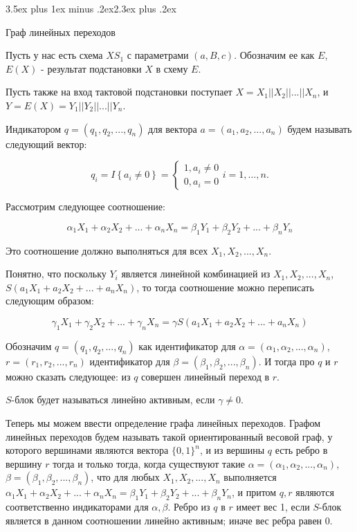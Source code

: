 \documentclass[a4paper,12pt]{report}
\makeatletter
\theoremstyle{plain} %
\theoremstyle{definition}
\theoremstyle{remark}
\renewcommand{\section}{\@startsection{section}{1}{18pt}%
{3.5ex plus 1ex minus .2ex}{2.3ex plus .2ex}%
{\normalfont\Large\bfseries\raggedright}}%
\makeatother
\begin{document}
\begin{large}
\section{Граф линейных переходов}

Пусть у нас есть схема $XS_1$ с параметрами $(a, B, c)$. Обозначим ее как $E$,  $E(X)$ - результат подстановки $X$ в схему $E$. 

Пусть также на вход тактовой подстановки поступает $X = X_1||X_2||...||X_n$, и $Y=E(X) = Y_1||Y_2||...||Y_n$.

Индикатором $q = (q_1, q_2, ..., q_n)$ для вектора $a=(a_1, a_2, ..., a_n)$ будем называть следующий вектор:

\begin{equation}
q_i=I\left\{a_i\ne 0\right\}=\left\{ \begin{array}{c}
1,a_i \neq 0 \\
0,a_i = 0\end{array}
\right.i=1,\dots , n.
\end{equation}

Рассмотрим следующее соотношение:

\begin{equation}
\label{eq:lin_proportion}
\alpha_1X_1 + \alpha_2X_2 + ... + \alpha_nX_n = \beta_1Y_1 + \beta_2Y_2 + ... + \beta_nY_n
\end{equation}

Это соотношение должно выполняться для всех $X_1, X_2, ..., X_n$.

Понятно, что поскольку $Y_i$ является линейной комбинацией из $X_1, X_2, ..., X_n$, $S(a_1X_1 + a_2X_2 + ... + a_nX_n)$, то тогда соотношение можно переписать следующим образом:

\begin{equation}\label{eq:in_gamma}
\gamma_1X_1 + \gamma_2X_2 + ... + \gamma_nX_n = \gamma S(a_1X_1 + a_2X_2 + ... + a_nX_n)\end{equation}

Обозначим $q=(q_1, q_2, ..., q_n)$ как идентификатор для $\alpha=(\alpha_1, \alpha_2, ..., \alpha_n)$, $r=(r_1, r_2, ..., r_n)$ идентификатор для $\beta = (\beta_1, \beta_2, ..., \beta_n)$. И тогда про $q$ и $r$ можно сказать следующее: из $q$ совершен линейный переход в $r$. 

$S$-блок будет называться линейно активным, если $\gamma \neq 0$.

Теперь мы можем ввести определение графа линейных переходов. Графом линейных переходов будем называть такой ориентированный весовой граф, у которого вершинами являются вектора $\{0, 1\}^n$, и из вершины $q$ есть ребро в вершину $r$ тогда и только тогда, когда существуют такие $\alpha = (\alpha_1, \alpha_2, ..., \alpha_n)$, $\beta = (\beta_1, \beta_2, ..., \beta_n)$, что для любых $X_1, X_2, ..., X_n$ выполняется $\alpha_1X_1 + \alpha_2X_2 + ... + \alpha_nX_n = \beta_1Y_1 + \beta_2Y_2 + ... + \beta_nY_n$, и притом $q, r$ являются соответственно индикаторами для $\alpha, \beta$. Ребро из $q$ в $r$ имеет вес 1, если $S$-блок является в данном соотношении линейно активным; иначе вес ребра равен 0.


\end{large}
\end{document}
